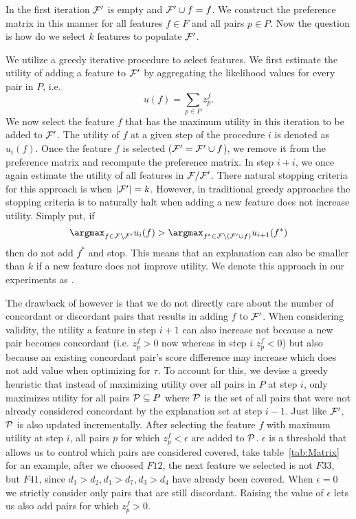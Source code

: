 In the first iteration $\f'$ is empty and $\f' \cup f = f$. We construct the preference matrix in this manner for all features $f \in F$ and all pairs $p \in P$. Now the question is how do we select $k$ features to populate $\f'$. 

    

 We utilize a greedy iterative procedure to select features. We first estimate the utility of adding a feature to $\f'$ by aggregating the likelihood values for every pair in $P$, i.e. 
$$u(f) = \sum_{p \in P} z^{f}_{p}.$$
We now select the feature $f$ that has the maximum utility in this iteration to be added to $\f'$. The utility of $f$ at a given step of the procedure $i$ is denoted as $u_i(f)$. Once the feature $f$ is selected ($\f' = \f' \cup f$), we remove it from the preference matrix and recompute the preference matrix. In step $i+i$, we once again estimate the utility of all features in $\f / \f'$. There natural stopping criteria for this approach is when $|\f'| = k$. However, in traditional greedy approaches the stopping criteria is to naturally halt when adding a new feature does not increase utility. Simply put, if $$\argmax_{f \in \f \setminus \f'} u_i(f) > \argmax_{f^* \in \f \setminus (\f' \cup f)} u_{i+1}(f^*)$$ then do not add $f^*$ and stop. This means that an explanation can also be smaller than $k$ if a new feature does not improve utility. We denote this approach in our experiments as \greedy. 

 The drawback of \greedy  however is that we do not directly care about the number of concordant or discordant pairs that results in adding $f$ to $\f'$. When considering validity, the utility a feature in step $i+1$ can also increase not because a new pair becomes concordant (i.e. $z^{f}_{p} > 0$ now whereas in step $i$ $z^{f}_{p} < 0$) but also because an existing concordant pair's score difference may increase which does not add value when optimizing for $\tau$. To account for this, we devise a greedy heuristic that instead of maximizing utility over all pairs in $P$ at step $i$, only maximizes utility for all pairs $\P \subseteq P$ where $\P$ is the set of all pairs that were not already considered concordant by the explanation set at step $i-1$. Just like $\f'$, $\P$ is also updated incrementally. After selecting the feature $f$ with maximum utility at step $i$, all pairs $p$ for which $z^{f}_{p} < \epsilon$ are added to $\P$. $\epsilon$ is a threshold that allows us to control which pairs are considered covered, take table~\ref{tab:Matrix} for an example, after we choosed $F12$, the next feature we selected is not $F33$, but $F41$, since $d_{1}>d_{2},d_{1}>d_{7},d_{3}>d_{4}$ have already been covered. When $\epsilon = 0$ we strictly consider only pairs that are still discordant. Raising the value of $\epsilon$ lets us also add pairs for which $z^{f}_{p}>0$.

